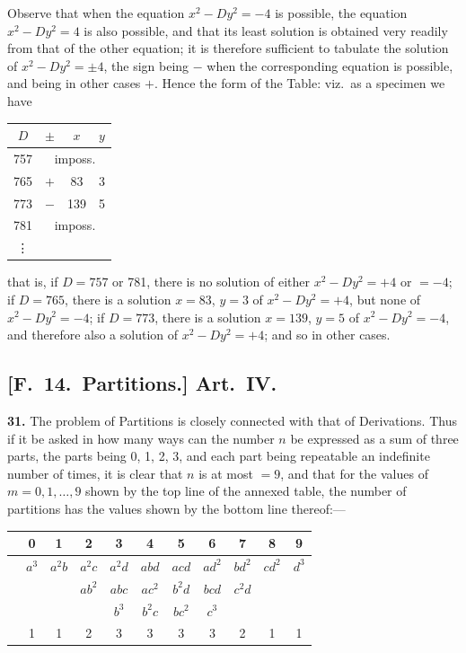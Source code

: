 \documentclass[11pt,a4paper]{article}
\begin{document}
Observe that when the equation $x^{2} - Dy^{2} = -4$ is possible, the equation $x^{2} - Dy^{2} = 4$ is also possible,
and that its least solution is obtained very readily from that of the other equation; it is therefore
sufficient to tabulate the solution of $x^{2} - Dy^{2} = \pm 4$, the sign being $-$ when the
corresponding equation is possible, and being in other cases $+$. Hence the form of
the Table: viz.\ as a specimen we have
\begin{center}\begin{tabular}{c|c|c|c}$D$ & $\pm$ & $x$ & $y$ \\
\hline
757 & \multicolumn{3}{c}{imposs.} \\
765 & $+$ & 83 & 3 \\
773 & $-$ & 139 & 5 \\
781 & \multicolumn{3}{c}{imposs.} \\
\vdots & & & \\
\end{tabular}\end{center}

that is, if $D = 757$ or 781, there is no solution of either $x^{2} - Dy^{2} = +4$ or $= -4$; if
$D = 765$, there is a solution $x = 83$, $y = 3$ of $x^{2} - Dy^{2} = +4$, but none of $x^{2} - Dy^{2} = -4$;
if $D = 773$, there is a solution $x = 139$, $y = 5$ of $x^{2} - Dy^{2} = -4$, and therefore also a
solution of $x^{2} - Dy^{2} = +4$; and so in other cases.


\newpage
\subsection*{[F.\ 14.\ Partitions.] Art.\ IV.}

\textbf{31.} The problem of Partitions is closely connected with that of Derivations.
Thus if it be asked in how many ways can the number $n$ be expressed as a sum
of three parts, the parts being 0, 1, 2, 3, and each part being repeatable an indefinite
number of times, it is clear that $n$ is at most $= 9$, and that for the values of
$m = 0, 1, \ldots, 9$ shown by the top line of the annexed table, the number of partitions
has the values shown by the bottom line thereof:---

\begin{center}
\begin{tabular}{c|cccccccccc}
 & 0 & 1 & 2 & 3 & 4 & 5 & 6 & 7 & 8 & 9 \\
\hline
 & $a^{3}$ & $a^{2}b$ & $a^{2}c$ & $a^{2}d$ & $abd$ & $acd$ & $ad^{2}$ & $bd^{2}$ & $cd^{2}$ & $d^{3}$ \\
 & & & $ab^{2}$ & $abc$ & $ac^{2}$ & $b^{2}d$ & $bcd$ & $c^{2}d$ & & \\
 & & & & $b^{3}$ & $b^{2}c$ & $bc^{2}$ & $c^{3}$ & & & \\
\hline
 & 1 & 1 & 2 & 3 & 3 & 3 & 3 & 2 & 1 & 1 \\
\end{tabular}
\end{center}
\end{document}
